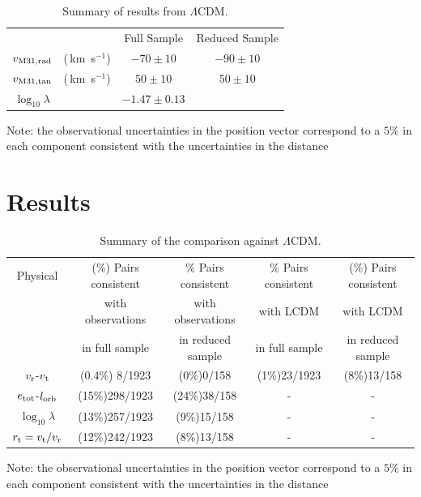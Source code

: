 \documentclass{emulateapj}
\newcommand{\kms}{\,km~s$^{-1}$}
\begin{document}
\begin{table}
\caption{Summary of results from $\Lambda$CDM.}
\begin{center}
\begin{tabular}{cccc}\hline
 &  & Full Sample & Reduced Sample\\
$v_{\rm M31,rad}$ &(\kms) & $-70\pm 10$ & $-90\pm 10$\\
$v_{\rm M31,tan}$ &(\kms) & $50\pm 10$ & $50\pm 10$\\
$\log_{10}\lambda$& & $-1.47\pm 0.13$& \\ 
\end{tabular}
\end{center}
\vspace{1mm}
Note: the observational uncertainties in the position vector
correspond to a $5\%$ in each component consistent with the
uncertainties in the distance \citep[see references
  in][]{vanderMarel08} 

\label{table:2}
\end{table}


\section{Results}
\label{sec:results}


\begin{table}
\caption{Summary of the comparison against $\Lambda$CDM.}
\begin{center}
\begin{tabular}{ccccc}\hline
Physical & (\%) Pairs consistent & \% Pairs consistent & \% Pairs
consistent& (\%) Pairs consistent\\ 
& with observations & with observations & with LCDM & with LCDM\\ 
 & in full sample & in reduced sample & in full sample & in reduced sample\\ \hline
$v_{\rm r}$-$v_{\rm t}$ & (0.4\%) 8/1923 & (0\%)0/158 & (1\%)23/1923 & (8\%)13/158\\
$e_{\rm tot}$-$l_{\rm orb}$ & (15\%)298/1923 & (24\%)38/158 & - & -\\
$\log_{10}\lambda$ & (13\%)257/1923 & (9\%)15/158 & - & -\\
$r_{\rm t}=v_{\rm t}/v_{\rm r}$& (12\%)242/1923 & (8\%)13/158 & -& -\\
\end{tabular}
\end{center}
\vspace{1mm}
Note: the observational uncertainties in the position vector
correspond to a $5\%$ in each component consistent with the
uncertainties in the distance \citep[see references
  in][]{vanderMarel08} 

\label{table:2}
\end{table}
\end{document}
